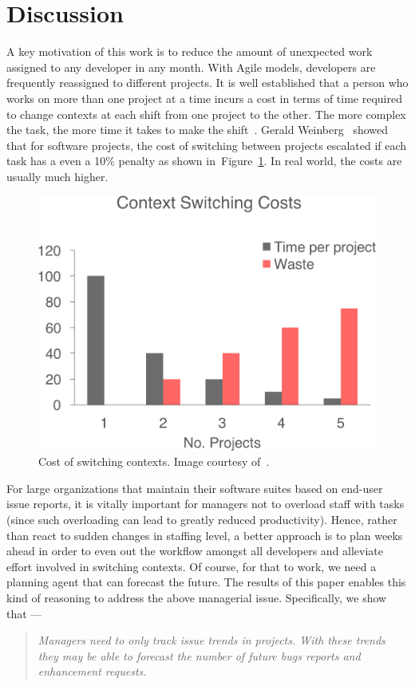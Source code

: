 \documentclass[sigconf, preprint]{acmart}
\newcommand{\fig}[1]{Figure~\ref{fig:#1}}
\begin{document}
\section{Discussion}
\label{sect:discuss}
A key motivation of this work is to reduce the amount of unexpected work assigned to any developer in any month.
With Agile models, developers are frequently reassigned to different projects. It is well established that a person who works on more than one project at a time incurs a cost in terms of time required to change contexts at each shift from one project to the other. The more complex the task, the more time it takes to make the shift~\cite{tugend_2008}. Gerald Weinberg~\cite{weinberg1992quality} showed that for software 
projects, the cost of switching between projects escalated if each task has a 
even a 10\% penalty as shown in~\fig{context}. In real world, the 
costs are usually much higher.
\begin{figure}[b!]
\centering
\includegraphics[width=0.7\linewidth]{images/context.png}
\caption{Cost of switching contexts. Image courtesy 
of~\cite{weinberg1992quality}.}
\label{fig:context}
\end{figure}

For large organizations that maintain their software suites based on end-user issue reports, 
it is vitally important for managers not to overload staff with tasks (since 
such overloading can lead to greatly reduced productivity). Hence, rather than
react to sudden changes in staffing level, a better approach is to plan weeks 
ahead in order to even out the workflow amongst all developers and alleviate 
effort involved in switching contexts. Of course, for that to work, we need a 
planning agent that can forecast the future. The results of this paper enables
this kind of reasoning to address the above managerial issue. Specifically, we
show that --- 
\begin{quote}
\textit{Managers need to only track issue trends in projects. With these trends 
they may be able to forecast the number of future bugs reports and enhancement requests.}
\end{quote}
\end{document}
